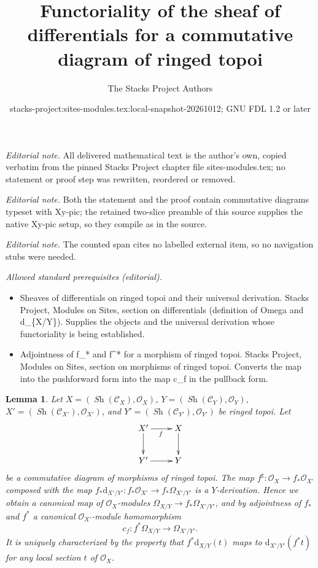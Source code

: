 \documentclass[10pt,a4paper]{amsart}
\title{Functoriality of the sheaf of differentials for a commutative diagram of ringed topoi}
\author{The Stacks Project Authors}
\date{stacks-project:sites-modules.tex:local-snapshot-20261012; GNU FDL 1.2 or later}
\theoremstyle{plain}
\newtheorem{lemma}[subsection]{Lemma}
\theoremstyle{definition}
\theoremstyle{remark}
\numberwithin{equation}{subsection}
\def\Sh{\mathop{\mathit{Sh}}\nolimits}
\begin{document}
\maketitle
\noindent\textit{Editorial note.} All delivered mathematical text is the author's own, copied verbatim from the pinned Stacks Project chapter file sites-modules.tex; no statement or proof step was rewritten, reordered or removed.\par\medskip
\noindent\textit{Editorial note.} Both the statement and the proof contain commutative diagrams typeset with Xy-pic; the retained two-slice preamble of this source supplies the native Xy-pic setup, so they compile as in the source.\par\medskip
\noindent\textit{Editorial note.} The counted span cites no labelled external item, so no navigation stubs were needed.\par\medskip
\noindent\textit{Allowed standard prerequisites (editorial).}\begin{itemize}
\item Sheaves of differentials on ringed topoi and their universal derivation. Stacks Project, Modules on Sites, section on differentials (definition of Omega and d\_\{X/Y\}). Supplies the objects and the universal derivation whose functoriality is being established.
\item Adjointness of f\_* and f\textasciicircum{}* for a morphism of ringed topoi. Stacks Project, Modules on Sites, section on morphisms of ringed topoi. Converts the map into the pushforward form into the map c\_f in the pullback form.
\end{itemize}\medskip
\begin{lemma}
\label{lemma-functoriality-differentials-ringed-topoi}
Let
$X = (\Sh(\mathcal{C}_X), \mathcal{O}_X)$,
$Y = (\Sh(\mathcal{C}_Y), \mathcal{O}_Y)$,
$X' = (\Sh(\mathcal{C}_{X'}), \mathcal{O}_{X'})$, and
$Y' = (\Sh(\mathcal{C}_{Y'}), \mathcal{O}_{Y'})$ be ringed topoi.
Let
$$
\xymatrix{
X' \ar[d] \ar[r]_f & X \ar[d] \\
Y' \ar[r] & Y
}
$$
be a commutative diagram of morphisms of ringed topoi. The map
$f^\sharp : \mathcal{O}_X \to f_*\mathcal{O}_{X'}$ composed with the map
$f_*\text{d}_{X'/Y'} : f_*\mathcal{O}_{X'} \to f_*\Omega_{X'/Y'}$ is a
$Y$-derivation. Hence we obtain a canonical map of $\mathcal{O}_X$-modules
$\Omega_{X/Y} \to f_*\Omega_{X'/Y'}$, and by
adjointness of $f_*$ and $f^*$ a
canonical $\mathcal{O}_{X'}$-module homomorphism
$$
c_f : f^*\Omega_{X/Y} \longrightarrow \Omega_{X'/Y'}.
$$
It is uniquely characterized by the property that
$f^*\text{d}_{X/Y}(t)$ maps to $\text{d}_{X'/Y'}(f^* t)$
for any local section $t$ of $\mathcal{O}_X$.
\end{lemma}
\end{document}
